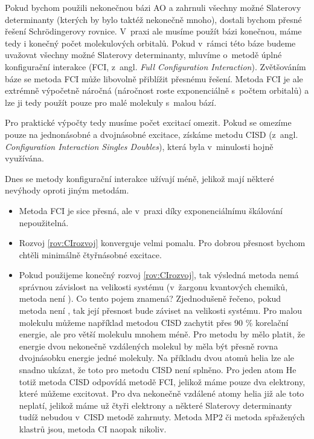 Pokud bychom použili nekonečnou bázi AO a zahrnuli všechny možné Slaterovy determinanty (kterých by bylo taktéž nekonečně mnoho), dostali bychom přesné řešení Schr\"{o}dingerovy rovnice. V~praxi ale musíme použít bázi konečnou, máme tedy i konečný počet molekulových orbitalů. Pokud v~rámci této báze budeme uvažovat všechny možné Slaterovy determinanty, mluvíme o~metodě úplné konfigurační interakce (FCI, z~angl. \textit{Full Configuration Interaction}). Zvětšováním báze se metoda FCI může libovolně přiblížit přesnému řešení. Metoda FCI je ale extrémně výpočetně náročná (náročnost roste exponenciálně s~počtem orbitalů) a lze ji tedy použít pouze pro malé molekuly s~malou bází.

Pro praktické výpočty tedy musíme počet excitací omezit. Pokud se omezíme pouze na jednonásobné a dvojnásobné excitace, získáme metodu CISD (z~angl. \textit{Configuration Interaction Singles Doubles}), která byla v~minulosti hojně využívána.

Dnes se metody konfigurační interakce užívají méně, jelikož mají některé nevýhody oproti jiným metodám. 
\begin{itemize}
\item Metoda FCI je sice přesná, ale v~praxi díky exponenciálnímu škálování nepoužitelná.
\item Rozvoj \ref{rov:CIrozvoj} konverguje velmi pomalu. Pro dobrou přesnost bychom chtěli minimálně čtyřnásobné excitace.
\item Pokud použijeme konečný rozvoj \ref{rov:CIrozvoj}, tak výsledná metoda nemá správnou závislost na velikosti systému (v~žargonu kvantových chemiků, metoda není ). Co tento pojem znamená? Zjednodušeně řečeno, pokud metoda není , tak její přesnost bude záviset na velikosti systému. Pro malou molekulu můžeme například metodou CISD zachytit přes 90 \% korelační energie, ale pro větší molekulu mnohem méně. Pro  metodu by mělo platit, že energie dvou nekonečně vzdálených molekul by měla být přesně rovna dvojnásobku energie jedné molekuly. Na příkladu dvou atomů helia lze ale snadno ukázat, že toto pro metodu CISD není splněno. Pro jeden atom He totiž metoda CISD odpovídá metodě FCI, jelikož máme pouze dva elektrony, které můžeme excitovat. Pro dva nekonečně vzdálené atomy helia již ale toto neplatí, jelikož máme už čtyři elektrony a některé Slaterovy determinanty tudíž nebudou v~CISD metodě zahrnuty. 
Metoda MP2 či metoda spřažených klastrů  jsou, metoda CI naopak nikoliv. 
\end{itemize}


